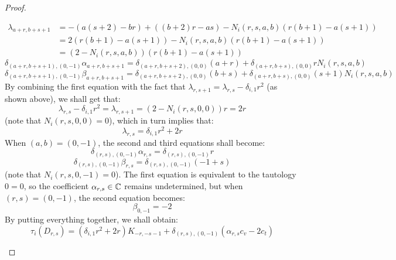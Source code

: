 \begin{proof}
\begin{enumerate}
                        $$
                            \begin{aligned}
                                \lambda_{a + r, b + s + 1} & = -\left( a(s + 2) - br \right) + \left( (b + 2) r - as \right) - N_i(r, s, a, b)( r(b + 1) - a(s + 1) )
                                \\
                                & = 2( r(b + 1) - a(s + 1) ) - N_i(r, s, a, b)( r(b + 1) - a(s + 1) )
                                \\
                                & = ( 2 - N_i(r, s, a, b) ) ( r(b + 1) - a(s + 1) )
                            \end{aligned}
                        $$
                        $$\delta_{(a + r, b + s + 1), (0, -1)} \alpha_{a + r, b + s + 1} = \delta_{(a + r, b + s + 2), (0, 0)} (a + r) + \delta_{(a + r, b + s), (0, 0)} r N_i(r, s, a, b)$$
                        $$\delta_{(a + r, b + s + 1), (0, -1)} \beta_{a + r, b + s + 1} = \delta_{(a + r, b + s + 2), (0, 0)} (b + s) + \delta_{(a + r, b + s), (0, 0)} (s + 1) N_i(r, s, a, b)$$
                    By combining the first equation with the fact that $\lambda_{r, s + 1} = \lambda_{r, s} - \delta_{i, 1} r^2$ (as shown above), we shall get that:
                        $$\lambda_{r, s} - \delta_{i, 1} r^2 = \lambda_{r, s + 1} = (2 - N_i(r, s, 0, 0)) r = 2r$$
                    (note that $N_i(r, s, 0, 0) = 0$), which in turn implies that:
                        $$\lambda_{r, s} = \delta_{i, 1} r^2 + 2r$$
                    When $(a, b) = (0, -1)$, the second and third equations shall become:
                        $$\delta_{(r, s), (0, -1)} \alpha_{r, s} = \delta_{(r, s), (0, -1)} r$$
                        $$\delta_{(r, s), (0, -1)} \beta_{r, s} = \delta_{(r, s), (0, -1)} (-1 + s)$$
                    (note that $N_i(r, s, 0, -1) = 0$). The first equation is equivalent to the tautology $0 = 0$, so the coefficient $\alpha_{r, s} \in \mathbb{C}$ remains undetermined, but when $(r, s) = (0, -1)$, the second equation becomes:
                        $$\beta_{0, -1} = -2$$
                    By putting everything together, we shall obtain:
                        $$\tau_i(D_{r, s}) = ( \delta_{i, 1} r^2 + 2r ) K_{-r, -s - 1} + \delta_{(r, s), (0, -1)} ( \alpha_{r, s} c_v - 2 c_t )$$


\end{enumerate}
\end{proof}
